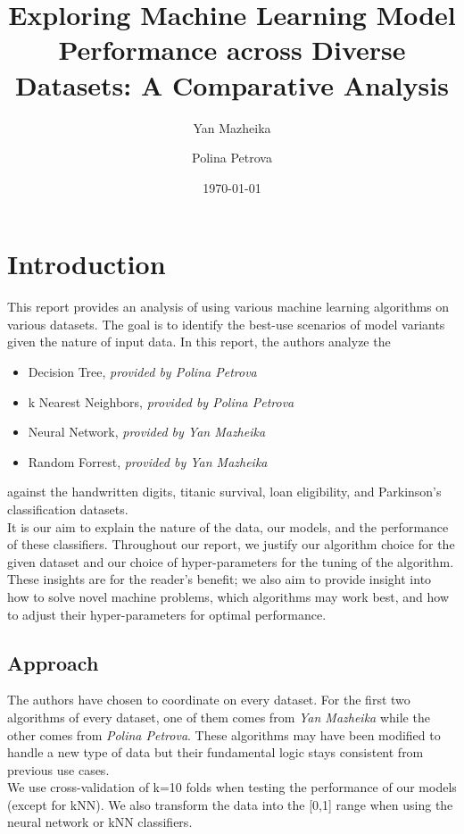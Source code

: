 \documentclass{article}
\title{Exploring Machine Learning Model Performance across Diverse Datasets: A Comparative Analysis}
\author{Yan Mazheika \and Polina Petrova}
\date{\today}
\begin{document}
\maketitle

\section*{Introduction}
This report provides an analysis of using various machine learning algorithms on various datasets.
The goal is to identify the best-use scenarios of model variants given the nature of input data.
In this report, the authors analyze the
\begin{itemize}
    \item Decision Tree, \textit{provided by Polina Petrova}
    \item k Nearest Neighbors, \textit{provided by Polina Petrova}
    \item Neural Network, \textit{provided by Yan Mazheika}
    \item Random Forrest, \textit{provided by Yan Mazheika}
\end{itemize}
against the handwritten digits, titanic survival, loan eligibility, and Parkinson's classification datasets.
\\

It is our aim to explain the nature of the data, our models, and the performance of these classifiers. Throughout our report,
we justify our algorithm choice for the given dataset and our choice of hyper-parameters for the tuning of the algorithm. These insights
are for the reader's benefit; we also aim to provide insight into how to solve novel machine problems, which algorithms may work best, and how
to adjust their hyper-parameters for optimal performance.

\subsection*{Approach}
The authors have chosen to coordinate on every dataset. For the first two algorithms of every dataset, one of them comes from \textit{Yan Mazheika}
while the other comes from \textit{Polina Petrova}. These algorithms may have been modified to handle a new type of data
but their fundamental logic stays consistent from previous use cases.
\\

We use cross-validation of k=10 folds when testing the performance of our models (except for kNN). We also transform the data into the [0,1] range when using the neural network or kNN classifiers.
\end{document}
